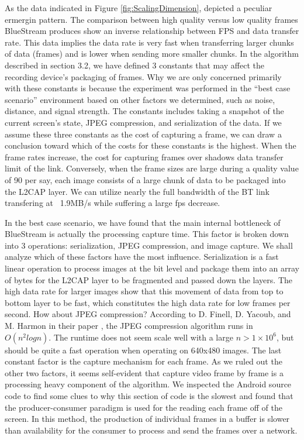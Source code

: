 \documentclass[a4paper,12pt]{article}
\begin{document}
As the data indicated in Figure \ref{fig:ScalingDimension}, depicted a peculiar ermergin pattern. The comparison between high quality versus low quality frames BlueStream produces show an inverse relationship between FPS and data transfer rate. This data implies the data rate is very fast when transferring larger chunks of data (frames) and is lower when sending more smaller chunks. In the algorithm described in section 3.2, we have defined 3 constants that may affect the recording device’s packaging of frames. Why we are only concerned primarily with these constants is because the experiment was performed in the “best case scenario” environment based on other factors we determined, such as noise, distance, and signal strength. The constants includes taking a snapshot of the current screen’s state, JPEG compression, and serialization of the data. If we assume these three constants as the cost of capturing a frame, we can draw a conclusion toward which of the costs for these constants is the highest. When the frame rates increase, the cost for capturing frames over shadows data transfer limit of the link. Conversely, when the frame sizes are large during a quality value of 90 per say, each image consists of a large chunk of data to be packaged into the L2CAP layer. We can utilize nearly the full bandwidth of the BT link transfering at ~1.9MB/s while suffering a large fps decrease. 

In the best case scenario, we have found that the main internal bottleneck of BlueStream is actually the processing capture time. This factor is broken down  into 3 operations: serialization, JPEG compression, and image capture. We shall analyze which of these factors have the most influence. Serialization is a fast linear operation to process images at the bit level and package them into an array of bytes for the L2CAP layer to be fragmented and passed down the layers. The high data rate for larger images show that this movement of data from top to bottom layer to be fast, which constitutes the high data rate for low frames per second. How about JPEG compression? According to D. Finell, D. Yacoub, and M. Harmon in their paper \cite{JPEGCompression}, the JPEG compression algorithm runs in $O(n^2 logn)$. The runtime does not seem scale well with a large $n > 1\times 10^6$, but should be quite a fast operation when operating on 640x480 images. The last constant factor is the capture mechanism for each frame. As we ruled out the other two factors, it seems self-evident that capture video frame by frame is a processing heavy component of the algorithm. We inspected the Android source code to find some clues to why this section of code is the slowest and found that the producer-consumer paradigm is used for the reading each frame off of the screen. In this method, the production of individual frames in a buffer is slower than availability for the consumer to process and send the frames over a network.  
    
\end{document}
